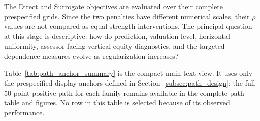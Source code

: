 \documentclass[10pt]{article}
\theoremstyle{definition}
\newcommand{\1}{\mathbf{1}}
\newcommand{\oldtext}[1]{\textcolor{blue}{\sout{#1}}}
\newcommand{\newtext}[1]{\textcolor{impGreen}{#1}}
\begin{document}
\newtext{The Direct and Surrogate objectives are evaluated over their complete}
prespecified grids. Since the two penalties have different numerical scales, their
$\rho$ values are not compared as equal-strength interventions. The principal
question at this stage is descriptive: how do prediction, valuation level,
horizontal uniformity, assessor-facing vertical-equity diagnostics, and the targeted
dependence measures evolve as regularization increases?

Table~\ref{tab:path_anchor_summary} is the compact main-text view. It uses only the
prespecified display anchors defined in Section~\ref{subsec:path_design}; the full
50-point positive path for each family remains available in the complete path table
and figures. No row in this table is selected because of its observed performance.
\end{document}
